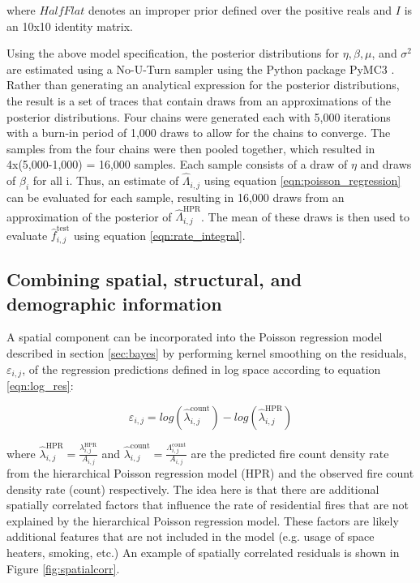 \documentclass{svjour3}
\begin{document}
\noindent where $HalfFlat$ denotes an improper prior defined over the positive reals and $I$ is an 10x10 identity matrix.

Using the above model specification, the posterior distributions for $\eta, \beta, \mu$, and $\sigma^2$ are estimated using a No-U-Turn sampler \cite{hoffman2014no} using the Python package PyMC3 \cite{salvatier2016probabilistic}. Rather than generating an analytical expression for the posterior distributions, the result is a set of traces that contain draws from an approximations of the posterior distributions. Four chains were generated each with 5,000 iterations with a burn-in period of 1,000 draws to allow for the chains to converge. The samples from the four chains were then pooled together, which resulted in 4x(5,000-1,000) = 16,000 samples. Each sample consists of a draw of $\eta$ and draws of $\beta_i$ for all i. Thus, an estimate of $\hat\Lambda_{i,j}$ using equation \ref{eqn:poisson_regression} can be evaluated for each sample, resulting in 16,000 draws from an approximation of the posterior of $\hat\Lambda^{\text{HPR}}_{i,j}$. The mean of these draws is then used to evaluate $\hat{f}^{\text{test}}_{i,j}$ using equation \ref{eqn:rate_integral}.



  \subsection{Combining spatial, structural, and demographic information} 
  A spatial component can be incorporated into the Poisson regression model described in section \ref{sec:bayes} by performing kernel smoothing on the residuals, $\varepsilon_{i,j}$, of the regression predictions defined in log space according to equation \ref{eqn:log_res}:
  
    \begin{equation}
    \label{eqn:log_res}
    \varepsilon_{i,j} = log(\hat\lambda^{\text{count}}_{i,j})- log(\hat\lambda^{\text{HPR}}_{i,j}) 
    \end{equation}

\noindent where $\hat\lambda^{\text{HPR}}_{i,j}=\frac{\lambda^{\text{HPR}}_{i,j}}{A_{i,j}}$ and $\hat\lambda^{\text{count}}_{i,j}=\frac{\Lambda^{\text{count}}_{i,j}}{A_{i,j}}$ are the predicted fire count density rate from the hierarchical Poisson regression model (HPR) and the observed fire count density rate (count) respectively. The idea here is that there are additional spatially correlated factors that influence the rate of residential fires that are not explained by the hierarchical Poisson regression model. These factors are likely additional features that are not included in the model (e.g. usage of space heaters, smoking, etc.) An example of spatially correlated residuals is shown in Figure \ref{fig:spatialcorr}. 
  
\end{document}
